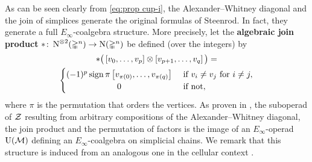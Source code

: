 As can be seen clearly from \cref{eq:prop cup-i}, the Alexander--Whitney diagonal and the join of simplices generate the original formulas of Steenrod.
In fact, they generate a full $E_\infty$-coalgebra structure.
More precisely, let the \textbf{algebraic join product} $\ast \colon \operatorname{N}^{\otimes 2}(\mathbb{\Delta}^n) \to \operatorname{N}(\mathbb{\Delta}^n)$ be defined (over the integers) by
\begin{multline}
	\ast \big(\left[v_0, \dots, v_p \right] \ot \left[v_{p+1}, \dots, v_q\right]\big) =\\
	\begin{cases}
		(-1)^p \sign \pi \left[v_{\pi(0)}, \dots, v_{\pi(q)}\right] &
		\text{ if } v_i \neq v_j \text{ for } i \neq j, \\
		\hfil 0 &
		\text{ if not},
	\end{cases}
\end{multline}
where $\pi$ is the permutation that orders the vertices.
As proven in \cite{medina2020prop1}, the suboperad of $\mathcal{Z}$ resulting from arbitrary compositions of the Alexander--Whitney diagonal, the join product and the permutation of factors is the image of an $E_\infty$-operad $\operatorname{U}(\mathcal{M})$ defining an $E_\infty$-coalgebra on simplicial chains.
We remark that this structure is induced from an analogous one in the cellular context \cite{medina2021prop2}.


